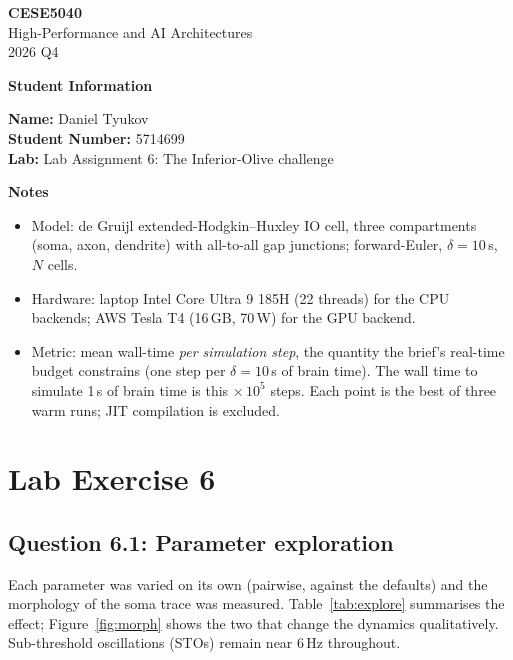 \documentclass[11pt,a4paper]{article}
\newcommand{\courseheader}{
    \begin{center}
        {\sffamily\Large\bfseries CESE5040}\\[0.3em]
        {\sffamily High-Performance and AI Architectures}\\
        {\color{lightgray}2026 Q4}
    \end{center}
}
\newcommand{\Q}[1]{\subsection*{Question #1}}
\begin{document}
\courseheader
\vspace{1em}

{\color{headingcolor}\sffamily\large\bfseries Student Information}

\textbf{Name:} Daniel Tyukov\\
\textbf{Student Number:} 5714699\\
\textbf{Lab:} Lab Assignment 6: The Inferior-Olive challenge

{\color{headingcolor}\sffamily\large\bfseries Notes}

\begin{itemize}\setlength\itemsep{0.1em}
    \item Model: de Gruijl extended-Hodgkin--Huxley IO cell, three compartments (soma, axon, dendrite) with all-to-all gap junctions; forward-Euler, $\delta = 10$\,\textmu s, $N$ cells.
    \item Hardware: laptop Intel Core Ultra 9 185H (22 threads) for the CPU backends; AWS Tesla T4 (16\,GB, 70\,W) for the GPU backend.
    \item Metric: mean wall-time \emph{per simulation step}, the quantity the brief's real-time budget constrains (one step per $\delta=10$\,\textmu s of brain time). The wall time to simulate 1\,s of brain time is this $\times\,10^5$ steps. Each point is the best of three warm runs; JIT compilation is excluded.
\end{itemize}

\vspace{0.5em}

\section*{\color{headingcolor}Lab Exercise 6}

\Q{6.1: Parameter exploration}

Each parameter was varied on its own (pairwise, against the defaults) and the morphology of the soma trace was measured. Table~\ref{tab:explore} summarises the effect; Figure~\ref{fig:morph} shows the two that change the dynamics qualitatively. Sub-threshold oscillations (STOs) remain near 6\,Hz throughout.
\end{document}
